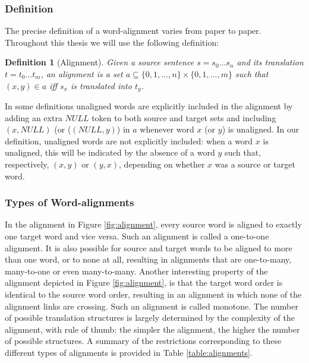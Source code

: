 \documentclass{report}
\theoremstyle{definition}
\theoremstyle{plain}
\newtheorem{definition}{Definition}
\begin{document}
\subsubsection{Definition}

The precise definition of a word-alignment varies from paper to paper. Throughout this thesis we will use the following definition:

\begin{definition}[Alignment]\label{def:alignment}
Given a source sentence $s = s_0 \ldots s_n$ and its translation $t = t_0 \ldots t_m$, an alignment is a set $a \subseteq \{0,1,\ldots,n\} \times \{0,1,\ldots,m\}$ such that $(x,y)\in a$ iff $s_x$ is translated into $t_y$.
\end{definition}

In some definitions unaligned words are explicitly included in the alignment by adding an extra $NULL$ token to both source and target sets and including $(x,NULL)$ (or ($(NULL,y)$) in $a$ whenever word $x$ (or $y$) is unaligned. In our definition, unaligned words are not explicitly included: when a word $x$ is unaligned, this will be indicated by the absence of a word $y$ such that, respectively, $(x,y)$ or $(y,x)$, depending on whether $x$ was a source or target word. 


\subsubsection{Types of Word-alignments}

In the alignment in Figure \ref{fig:alignment}, every source word is aligned to exactly one target word and vice versa. Such an alignment is called a one-to-one alignment. It is also possible for source and target words to be aligned to more than one word, or to none at all, resulting in alignments that are one-to-many, many-to-one or even many-to-many. Another interesting property of the alignment depicted in Figure \ref{fig:alignment}, is that the target word order is identical to the source word order, resulting in an alignment in which none of the alignment links are crossing. Such an alignment is called monotone. The number of possible translation structures is largely determined by the complexity of the alignment, with rule of thumb: the simpler the alignment, the higher the number of possible structures. A summary of the restrictions corresponding to these different types of alignments is provided in Table \ref{table:alignments}.
\end{document}
